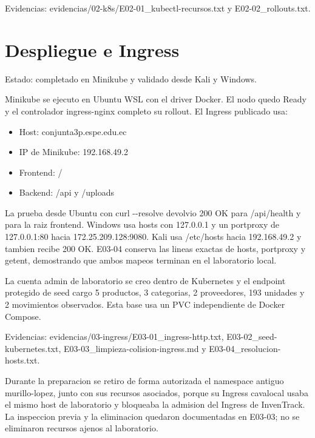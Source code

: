 Evidencias: evidencias/02-k8s/E02-01\_kubectl-recursos.txt y E02-02\_rollouts.txt.

\section{Despliegue e Ingress}\label{despliegue-e-ingress}

Estado: completado en Minikube y validado desde Kali y Windows.

Minikube se ejecuto en Ubuntu WSL con el driver Docker. El nodo quedo Ready y el controlador ingress-nginx completo su rollout. El Ingress publicado usa:

\begin{itemize}
\tightlist
\item
  Host: conjunta3p.espe.edu.ec
\item
  IP de Minikube: 192.168.49.2
\item
  Frontend: /
\item
  Backend: /api y /uploads
\end{itemize}

La prueba desde Ubuntu con curl -\/-resolve devolvio 200 OK para /api/health y para la raiz frontend. Windows usa hosts con 127.0.0.1 y un portproxy de 127.0.0.1:80 hacia 172.25.209.128:9080. Kali usa /etc/hosts hacia 192.168.49.2 y tambien recibe 200 OK. E03-04 conserva las lineas exactas de hosts, portproxy y getent, demostrando que ambos mapeos terminan en el laboratorio local.

La cuenta admin de laboratorio se creo dentro de Kubernetes y el endpoint protegido de seed cargo 5 productos, 3 categorias, 2 proveedores, 193 unidades y 2 movimientos observados. Esta base usa un PVC independiente de Docker Compose.

Evidencias: evidencias/03-ingress/E03-01\_ingress-http.txt, E03-02\_seed-kubernetes.txt, E03-03\_limpieza-colision-ingress.md y E03-04\_resolucion-hosts.txt.

Durante la preparacion se retiro de forma autorizada el namespace antiguo murillo-lopez, junto con sus recursos asociados, porque su Ingress cavalocal usaba el mismo host de laboratorio y bloqueaba la admision del Ingress de InvenTrack. La inspeccion previa y la eliminacion quedaron documentadas en E03-03; no se eliminaron recursos ajenos al laboratorio.
